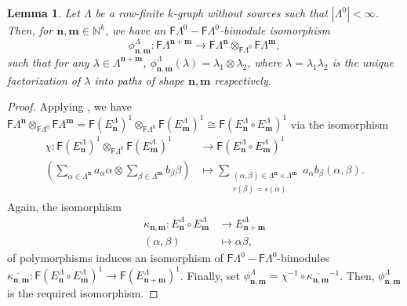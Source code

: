 \documentclass[12pt]{amsart}
\newcommand{\N}{\mathbf{n}}
\newcommand{\M}{\mathbf{m}}
\newtheorem{lem}[thm]{Lemma}
\theoremstyle{definition}
\theoremstyle{remark}
\def\r{{\textsf r}}
\begin{document}
\begin{lem}
Let $\Lambda$ be a row-finite $k$-graph without sources such that $|\Lambda^0|<\infty$. Then, for  $\N,\M\in \mathbb{N}^k$, we have an $\mathsf{F}\Lambda^0-\mathsf{F}\Lambda^0$-bimodule isomorphism
\[\phi_{\N,\M}^\Lambda:\mathsf{F}\Lambda^{\N+\M}\longrightarrow \mathsf{F}\Lambda^\N \otimes_{\mathsf{F}\Lambda^0} \mathsf{F}\Lambda^\M,\] such that for any $\lambda\in \Lambda^{\N+\M}$, $\phi_{\N,\M}^\Lambda(\lambda)=\lambda_1\otimes \lambda_2$, where $\lambda=\lambda_1 \lambda_2$ is the unique factorization of $\lambda$ into paths of shape $\N,\M$ respectively. 
\end{lem}
\begin{proof}
Applying \cite[Proposition 3.8]{ART}, we have $\mathsf{F}\Lambda^\N\otimes_{\mathsf{F}\Lambda^0}\mathsf{F}\Lambda^\M=\mathsf{F}(E_\N^\Lambda)^1\otimes_{\mathsf{F}\Lambda^0}\mathsf{F}(E_\M^\Lambda)^1\cong \mathsf{F}(E_\N^\Lambda\circ E_\M^\Lambda)^1$ via the isomorphism
\begin{align*}
    \chi:\mathsf{F}(E_\N^\Lambda)^1\otimes_{\mathsf{F}\Lambda^0}\mathsf{F}(E_\M^\Lambda)^1 &\longrightarrow \mathsf{F}(E_\N^\Lambda\circ E_\M^\Lambda)^1\\
    \left(\displaystyle{\sum_{\alpha\in \Lambda^\N}}a_\alpha \alpha \otimes \displaystyle{\sum_{\beta\in \Lambda^\M}}b_\beta \beta\right) &\longmapsto \displaystyle{\sum_{\substack{(\alpha,\beta)\in \Lambda^\N\times \Lambda^\M\\r(\beta)=s(\alpha)}}}a_\alpha b_\beta (\alpha,\beta).
\end{align*}
Again, the isomorphism 
\begin{align*}
\kappa_{\N,\M}:E_\N^\Lambda \circ E_\M^\Lambda &\longrightarrow E_{\N+\M}^\Lambda\\
(\alpha,\beta) &\longmapsto \alpha\beta,
\end{align*}
of polymorphisms induces an isomorphism of $\mathsf{F}\Lambda^0-\mathsf{F}\Lambda^0$-bimodules $\overline{\kappa_{\N,\M}}:\mathsf{F}(E_\N^\Lambda\circ E_\M^\Lambda)^1\longrightarrow \mathsf{F}(E_{\N+\M}^\Lambda)^1$. Finally, set $\phi_{\N,\M}^\Lambda=\chi^{-1}\circ \overline{\kappa_{\N,\M}}^{-1}$. Then, $\phi_{\N,\M}^\Lambda$ is the required isomorphism. 
\end{proof}
\end{document}
